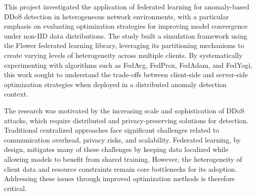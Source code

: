This project investigated the application of federated learning for anomaly-based DDoS detection in heterogeneous network environments, with a particular emphasis on evaluating optimization strategies for improving model convergence under non-IID data distributions. The study built a simulation framework using the Flower federated learning library, leveraging its partitioning mechanisms to create varying levels of heterogeneity across multiple clients. By systematically experimenting with algorithms such as FedAvg, FedProx, FedAdam, and FedYogi, this work sought to understand the trade-offs between client-side and server-side optimization strategies when deployed in a distributed anomaly detection context.

The research was motivated by the increasing scale and sophistication of DDoS attacks, which require distributed and privacy-preserving solutions for detection. Traditional centralized approaches face significant challenges related to communication overhead, privacy risks, and scalability. Federated learning, by design, mitigates many of these challenges by keeping data localized while allowing models to benefit from shared training. However, the heterogeneity of client data and resource constraints remain core bottlenecks for its adoption. Addressing these issues through improved optimization methods is therefore critical.

